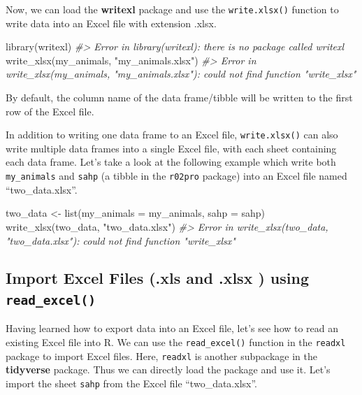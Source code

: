 \documentclass[
]{book}
\newenvironment{Shaded}{\begin{snugshade}}{\end{snugshade}}
\newcommand{\AttributeTok}[1]{\textcolor[rgb]{0.77,0.63,0.00}{#1}}
\newcommand{\CommentTok}[1]{\textcolor[rgb]{0.56,0.35,0.01}{\textit{#1}}}
\newcommand{\FunctionTok}[1]{\textcolor[rgb]{0.00,0.00,0.00}{#1}}
\newcommand{\NormalTok}[1]{#1}
\newcommand{\OtherTok}[1]{\textcolor[rgb]{0.56,0.35,0.01}{#1}}
\newcommand{\StringTok}[1]{\textcolor[rgb]{0.31,0.60,0.02}{#1}}
\begin{document}
Now, we can load the \textbf{writexl} package and use the \texttt{write.xlsx()} function to write data into an Excel file with extension .xlsx.

\begin{Shaded}
\begin{Highlighting}[]
\FunctionTok{library}\NormalTok{(writexl)}
\CommentTok{\#\textgreater{} Error in library(writexl): there is no package called \textquotesingle{}writexl\textquotesingle{}}
\FunctionTok{write\_xlsx}\NormalTok{(my\_animals, }\StringTok{"my\_animals.xlsx"}\NormalTok{)}
\CommentTok{\#\textgreater{} Error in write\_xlsx(my\_animals, "my\_animals.xlsx"): could not find function "write\_xlsx"}
\end{Highlighting}
\end{Shaded}

By default, the column name of the data frame/tibble will be written to the first row of the Excel file.

In addition to writing one data frame to an Excel file, \texttt{write.xlsx()} can also write multiple data frames into a single Excel file, with each sheet containing each data frame. Let's take a look at the following example which write both \texttt{my\_animals} and \texttt{sahp} (a tibble in the \texttt{r02pro} package) into an Excel file named ``two\_data.xlsx''.

\begin{Shaded}
\begin{Highlighting}[]
\NormalTok{two\_data }\OtherTok{\textless{}{-}} \FunctionTok{list}\NormalTok{(}\AttributeTok{my\_animals =}\NormalTok{ my\_animals, }\AttributeTok{sahp =}\NormalTok{ sahp)}
\FunctionTok{write\_xlsx}\NormalTok{(two\_data, }\StringTok{"two\_data.xlsx"}\NormalTok{)}
\CommentTok{\#\textgreater{} Error in write\_xlsx(two\_data, "two\_data.xlsx"): could not find function "write\_xlsx"}
\end{Highlighting}
\end{Shaded}

\hypertarget{import-excel-files-.xls-and-.xlsx-using-read_excel}{%
\subsection{\texorpdfstring{Import Excel Files (.xls and .xlsx ) using \texttt{read\_excel()}}{Import Excel Files (.xls and .xlsx ) using read\_excel()}}\label{import-excel-files-.xls-and-.xlsx-using-read_excel}}

Having learned how to export data into an Excel file, let's see how to read an existing Excel file into R. We can use the \texttt{read\_excel()} function in the \texttt{readxl} package to import Excel files. Here, \texttt{readxl} is another subpackage in the \textbf{tidyverse} package. Thus we can directly load the package and use it.
Let's import the sheet \texttt{sahp} from the Excel file ``two\_data.xlsx''.
\end{document}
